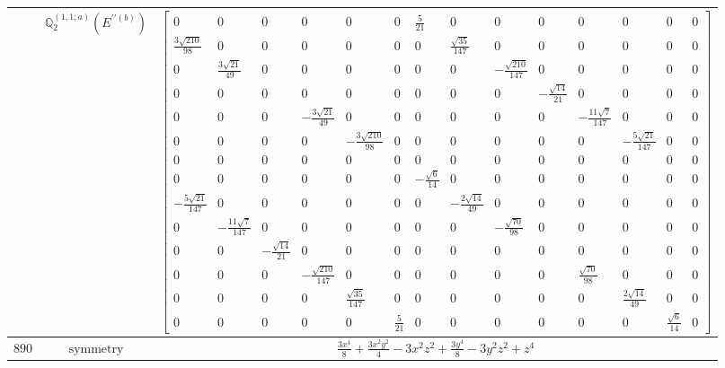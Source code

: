 \documentclass[fleqn,8pt,landscape]{jsarticle}
\begin{document}
\begin{longtable}{ccc}
$  $ & $ \mathbb{Q}_{2}^{(1,1;a)}(E^{\prime\prime(b)}) $ & $ \begin{bmatrix} 0 & 0 & 0 & 0 & 0 & 0 & \frac{5}{21} & 0 & 0 & 0 & 0 & 0 & 0 & 0 \\ \frac{3 \sqrt{210}}{98} & 0 & 0 & 0 & 0 & 0 & 0 & \frac{\sqrt{35}}{147} & 0 & 0 & 0 & 0 & 0 & 0 \\ 0 & \frac{3 \sqrt{21}}{49} & 0 & 0 & 0 & 0 & 0 & 0 & - \frac{\sqrt{210}}{147} & 0 & 0 & 0 & 0 & 0 \\ 0 & 0 & 0 & 0 & 0 & 0 & 0 & 0 & 0 & - \frac{\sqrt{14}}{21} & 0 & 0 & 0 & 0 \\ 0 & 0 & 0 & - \frac{3 \sqrt{21}}{49} & 0 & 0 & 0 & 0 & 0 & 0 & - \frac{11 \sqrt{7}}{147} & 0 & 0 & 0 \\ 0 & 0 & 0 & 0 & - \frac{3 \sqrt{210}}{98} & 0 & 0 & 0 & 0 & 0 & 0 & - \frac{5 \sqrt{21}}{147} & 0 & 0 \\ 0 & 0 & 0 & 0 & 0 & 0 & 0 & 0 & 0 & 0 & 0 & 0 & 0 & 0 \\ 0 & 0 & 0 & 0 & 0 & 0 & - \frac{\sqrt{6}}{14} & 0 & 0 & 0 & 0 & 0 & 0 & 0 \\ - \frac{5 \sqrt{21}}{147} & 0 & 0 & 0 & 0 & 0 & 0 & - \frac{2 \sqrt{14}}{49} & 0 & 0 & 0 & 0 & 0 & 0 \\ 0 & - \frac{11 \sqrt{7}}{147} & 0 & 0 & 0 & 0 & 0 & 0 & - \frac{\sqrt{70}}{98} & 0 & 0 & 0 & 0 & 0 \\ 0 & 0 & - \frac{\sqrt{14}}{21} & 0 & 0 & 0 & 0 & 0 & 0 & 0 & 0 & 0 & 0 & 0 \\ 0 & 0 & 0 & - \frac{\sqrt{210}}{147} & 0 & 0 & 0 & 0 & 0 & 0 & \frac{\sqrt{70}}{98} & 0 & 0 & 0 \\ 0 & 0 & 0 & 0 & \frac{\sqrt{35}}{147} & 0 & 0 & 0 & 0 & 0 & 0 & \frac{2 \sqrt{14}}{49} & 0 & 0 \\ 0 & 0 & 0 & 0 & 0 & \frac{5}{21} & 0 & 0 & 0 & 0 & 0 & 0 & \frac{\sqrt{6}}{14} & 0 \end{bmatrix} $ \\ \hline
$ 890 $ & $ \text{symmetry} $ & $ \frac{3 x^{4}}{8} + \frac{3 x^{2} y^{2}}{4} - 3 x^{2} z^{2} + \frac{3 y^{4}}{8} - 3 y^{2} z^{2} + z^{4} $ \\

\end{longtable}
\end{document}
